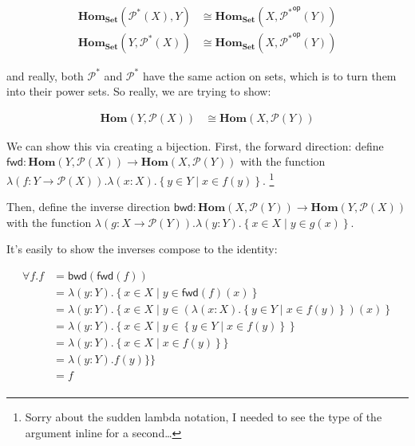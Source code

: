 \documentclass{article}
\theoremstyle{plain}
\theoremstyle{definition}
\begin{document}
\[
\begin{aligned}
{\mathbf{Hom}}_{\mathbf{Set}} \left( {\mathcal{P}}^{\ast } \left( X \right), Y \right) & \cong {\mathbf{Hom}}_{\mathbf{Set}} \left( X, {{\mathcal{P}}^{\ast }}^{\mathsf{op}}\left( Y \right) \right) \\ {\mathbf{Hom}}_{\mathbf{Set}} \left( Y, {\mathcal{P}}^{\ast }\left( X \right) \right) & \cong {\mathbf{Hom}}_{\mathbf{Set}} \left( X, {{\mathcal{P}}^{\ast }}^{\mathsf{op}}\left( Y \right) \right)
\end{aligned}
\]

and really, both \ensuremath{{\mathcal{P}}^{\ast }} and \ensuremath{\operatorname{{\mathcal{P}}^{\ast }}} have the same action on sets, which is to turn them into their power sets. So really, we are trying to show:

\[
\begin{aligned}
\mathbf{Hom}\left( Y, \mathcal{P}\left( X \right) \right) & \cong \mathbf{Hom}\left( X, \mathcal{P}\left( Y \right) \right)
\end{aligned}
\]

We can show this via creating a bijection. First, the forward direction: define \ensuremath{\mathsf{fwd} : \mathbf{Hom}\left( Y, \mathcal{P}\left( X \right) \right) \rightarrow \mathbf{Hom}\left( X, \mathcal{P}\left( Y \right) \right)} with the function \ensuremath{\lambda \left( f : Y \rightarrow \mathcal{P}\left( X \right) \right) . \lambda \left( x : X \right) . \left\{ y \in Y \mid x \in f\left( y \right) \right\}}. \footnote{Sorry about the sudden lambda notation, I needed to see the type of the argument inline for a second\ldots{}}

Then, define the inverse direction \ensuremath{\mathsf{bwd} : \mathbf{Hom}\left( X, \mathcal{P}\left( Y \right) \right) \rightarrow \mathbf{Hom}\left( Y, \mathcal{P}\left( X \right) \right)} with the function \ensuremath{\lambda \left( g : X \rightarrow \mathcal{P}\left( Y \right) \right) . \lambda \left( y : Y \right) . \left\{ x \in X \mid y \in g\left( x \right) \right\}}.

It's easily to show the inverses compose to the identity:

\[
\begin{aligned}
\forall f . f & = \mathsf{bwd}\left( \mathsf{fwd}\left( f \right) \right) \\ & = \lambda \left( y : Y \right) . \left\{ x \in X \mid y \in \mathsf{fwd}\left( f \right)\left( x \right) \right\} \\ & = \lambda \left( y : Y \right) . \left\{ x \in X \mid y \in \left( \lambda \left( x : X \right) . \left\{ y \in Y \mid x \in f\left( y \right) \right\} \right)\left( x \right) \right\} \\ & = \lambda \left( y : Y \right) . \left\{ x \in X \mid y \in \left\{ y \in Y \mid x \in f\left( y \right) \right\} \right\} \\ & = \lambda \left( y : Y \right) . \left\{ x \in X \mid x \in f\left( y \right) \right\} \} \\ & = \lambda \left( y : Y \right) . f\left( y \right) \} \} \\ & = f \\
\end{aligned}
\]
\end{document}
